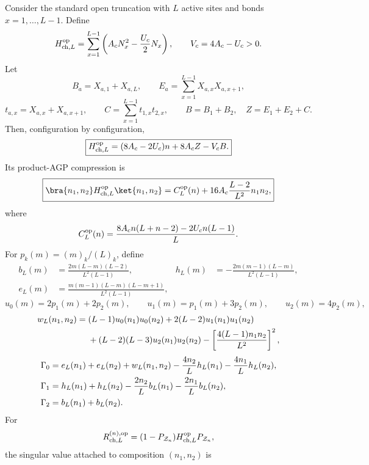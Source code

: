 \begin{corollary}
\label{cor:charge-leakage-open}
Consider the standard open truncation with $L$ active sites and bonds
$x=1,\ldots,L-1$.  Define
\[
 H_{{\rm ch},L}^{\rm op}
 =\sum_{x=1}^{L-1}\left(A_c N_x^2-\frac{U_c}{2}N_x\right),
 \qquad V_c=4A_c-U_c>0.
\]
Let
\[
 B_a=X_{a,1}+X_{a,L},\qquad
 E_a=\sum_{x=1}^{L-1}X_{a,x}X_{a,x+1},
\]
\[
 t_{a,x}=X_{a,x}+X_{a,x+1},\qquad
 C=\sum_{x=1}^{L-1}t_{1,x}t_{2,x},
 \qquad B=B_1+B_2,\quad Z=E_1+E_2+C.
\]
Then, configuration by configuration,
\begin{equation}
 \boxed{
 H_{{\rm ch},L}^{\rm op}
 =(8A_c-2U_c)n+8A_cZ-V_cB.}
 \label{eq:open-charge-decomposition}
\end{equation}
Its product-AGP compression is
\begin{equation}
 \boxed{
 \bra{n_1,n_2}H_{{\rm ch},L}^{\rm op}\ket{n_1,n_2}
 =C_L^{\rm op}(n)+16A_c\frac{L-2}{L^2}n_1n_2,}
 \label{eq:open-charge-selector}
\end{equation}
where
\begin{equation}
 C_L^{\rm op}(n)
 =\frac{8A_cn(L+n-2)-2U_cn(L-1)}{L}.
 \label{eq:open-charge-baseline}
\end{equation}
For $p_k(m)=(m)_k/(L)_k$, define
\begin{align}
 b_L(m)&=\frac{2m(L-m)(L-2)}{L^2(L-1)},
 &h_L(m)&=-\frac{2m(m-1)(L-m)}{L^2(L-1)},
 \label{eq:open-b-h}\\
 e_L(m)&=\frac{m(m-1)(L-m)(L-m+1)}{L^2(L-1)},
 \label{eq:open-e}
\end{align}
\[
 u_0(m)=2p_1(m)+2p_2(m),\qquad
 u_1(m)=p_1(m)+3p_2(m),\qquad
 u_2(m)=4p_2(m),
\]
\begin{align}
 w_L(n_1,n_2)={}&(L-1)u_0(n_1)u_0(n_2)
 +2(L-2)u_1(n_1)u_1(n_2)\notag\\
 &+(L-2)(L-3)u_2(n_1)u_2(n_2)
 -\left[\frac{4(L-1)n_1n_2}{L^2}\right]^2,
 \label{eq:open-w}
\end{align}
\begin{align}
 \Gamma_0={}&e_L(n_1)+e_L(n_2)+w_L(n_1,n_2)
 -\frac{4n_2}{L}h_L(n_1)-\frac{4n_1}{L}h_L(n_2),\notag\\
 \Gamma_1={}&h_L(n_1)+h_L(n_2)
 -\frac{2n_2}{L}b_L(n_1)-\frac{2n_1}{L}b_L(n_2),\notag\\
 \Gamma_2={}&b_L(n_1)+b_L(n_2).
 \label{eq:open-gammas}
\end{align}
For
\[
 R_{{\rm ch},L}^{(n),\rm op}
 =(1-P_{\mathcal Z_n})H_{{\rm ch},L}^{\rm op}P_{\mathcal Z_n},
\]
the singular value attached to composition $(n_1,n_2)$ is

\end{corollary}
